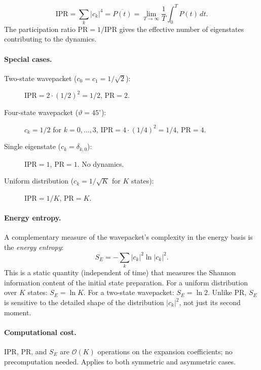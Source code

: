 \begin{result}\label{res:IPR}
\begin{equation}\label{eq:IPR_Pbar}
  \boxed{\text{IPR} = \sum_k |c_k|^4 = \overline{P(t)} = \lim_{T\to\infty}\frac{1}{T}\int_0^T P(t)\,dt.}
\end{equation}
The participation ratio $\text{PR} = 1/\text{IPR}$ gives the effective number of eigenstates contributing to the dynamics.
\end{result}

\paragraph{Special cases.}

\begin{description}
  \item[Two-state wavepacket ($c_0 = c_1 = 1/\sqrt{2}$):] $\text{IPR} = 2\cdot(1/2)^2 = 1/2$, $\text{PR} = 2$.
  \item[Four-state wavepacket ($\vartheta = 45^\circ$):] $c_k = 1/2$ for $k = 0,\ldots,3$, $\text{IPR} = 4\cdot(1/4)^2 = 1/4$, $\text{PR} = 4$.
  \item[Single eigenstate ($c_k = \delta_{k,0}$):] $\text{IPR} = 1$, $\text{PR} = 1$. No dynamics.
  \item[Uniform distribution ($c_k = 1/\sqrt{K}$ for $K$ states):] $\text{IPR} = 1/K$, $\text{PR} = K$.
\end{description}

\paragraph{Energy entropy.}

A complementary measure of the wavepacket's complexity in the energy basis is the \emph{energy entropy}:
\begin{equation}\label{eq:S_E}
  S_E = -\sum_k |c_k|^2 \ln|c_k|^2.
\end{equation}
This is a static quantity (independent of time) that measures the Shannon information content of the initial state preparation.
For a uniform distribution over $K$ states: $S_E = \ln K$.
For a two-state wavepacket: $S_E = \ln 2$.
Unlike PR, $S_E$ is sensitive to the detailed shape of the distribution $|c_k|^2$, not just its second moment.

\paragraph{Computational cost.}
IPR, PR, and $S_E$ are $\mathcal{O}(K)$ operations on the expansion coefficients; no precomputation needed.
Applies to both symmetric and asymmetric cases.

